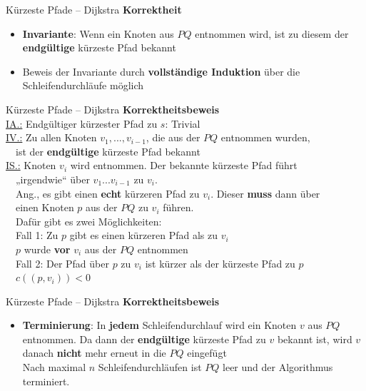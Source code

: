 \begin{frame}{Kürzeste Pfade – Dijkstra}
	\textbf{Korrektheit}
	\begin{itemize}
		\item \textbf{Invariante}: Wenn ein Knoten aus $PQ$ entnommen wird, ist zu diesem der \textbf{endgültige} kürzeste Pfad bekannt
		\pause
		\item Beweis der Invariante durch \textbf{vollständige Induktion} über die Schleifendurchläufe möglich
	\end{itemize}
\end{frame}

\iffalse

\begin{frame}{Kürzeste Pfade – Dijkstra}
	\textbf{Korrektheitsbeweis} \\
	\underline{IA.:} Endgültiger kürzester Pfad zu $s$: Trivial \yop \\[0,125cm]
	\pause
	\underline{IV.:} Zu allen Knoten $v_1, ..., v_{i-1}$, die aus der $PQ$ entnommen wurden, \\
	\quad\ \ ist der \textbf{endgültige} kürzeste Pfad bekannt \\[0,125cm]
	\pause
	\underline{IS.:} Knoten $v_i$ wird entnommen. Der bekannte kürzeste Pfad führt \\
	\quad\ \ „irgendwie“ über $v_1 ... v_{i-1}$ zu $v_i$. \\
	\pause
	\quad\ \ Ang., es gibt einen \textbf{echt} kürzeren Pfad zu $v_i$. Dieser \textbf{muss} dann über \\
	\quad\ \ einen Knoten $p$ aus der $PQ$ zu $v_i$ führen. \\
	\pause
	\quad\ \ Dafür gibt es zwei Möglichkeiten: \\
	\pause
	\quad\ \ Fall 1: Zu $p$ gibt es einen kürzeren Pfad als zu $v_i$ \\
	\pause
	\qquad\qquad\ \ \impl $p$ wurde \textbf{vor} $v_i$ aus der $PQ$ entnommen \crash \\
	\pause
	\quad\ \ Fall 2: Der Pfad über $p$ zu $v_i$ ist kürzer als der kürzeste Pfad zu $p$ \\
	\pause
	\qquad\qquad\ \ \impl $c((p, v_i)) < 0$ 
\end{frame}

\begin{frame}{Kürzeste Pfade – Dijkstra}
	\textbf{Korrektheitsbeweis} \\
	\begin{itemize}
		\item \textbf{Terminierung}: In \textbf{jedem} Schleifendurchlauf wird ein Knoten $v$ aus $PQ$ entnommen. Da dann der \textbf{endgültige} kürzeste Pfad zu $v$ bekannt ist, wird $v$ danach \textbf{nicht} mehr erneut in die $PQ$ eingefügt \\
		\impl Nach maximal $n$ Schleifendurchläufen ist $PQ$ leer und der Algorithmus terminiert.
	\end{itemize}
\end{frame}

